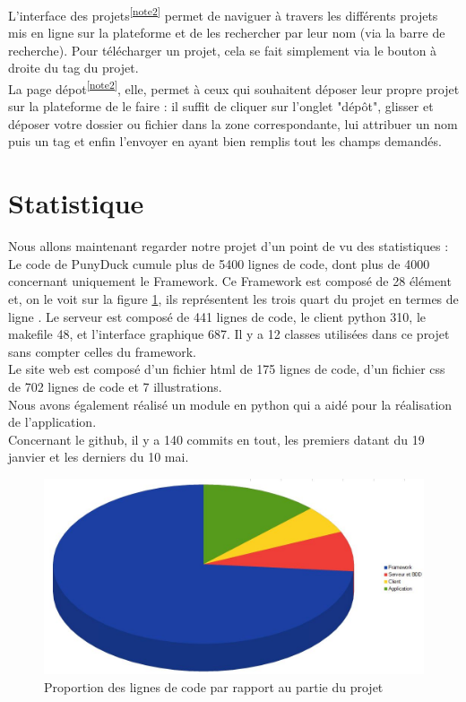 \documentclass[twoside]{report}
\begin{document}
L'interface des projets\textsuperscript{\ref{note2}} permet de naviguer à travers les différents projets mis en ligne sur la plateforme et de les rechercher par leur nom (via la barre de recherche). Pour télécharger un projet, cela se fait simplement via le bouton à droite du tag du projet.\\
La page dépot\textsuperscript{\ref{note2}}, elle, permet à ceux qui souhaitent déposer leur propre projet sur la plateforme de le faire : il suffit de cliquer sur l'onglet "dépôt", glisser et déposer votre dossier ou fichier dans la zone correspondante, lui attribuer un nom puis un tag et enfin l'envoyer en ayant bien remplis tout les champs demandés.

\newpage
\section{Statistique} %
Nous allons maintenant regarder notre projet d’un point de vu des statistiques :\\
Le code de PunyDuck cumule plus de 5400 lignes de code, dont plus de 4000 concernant uniquement le Framework. Ce Framework est composé de 28 élément et, on le voit sur la figure \ref{stats}, ils représentent les trois quart du projet en termes de ligne . Le serveur est composé de 441 lignes de code, le client python 310, le makefile 48, et l'interface graphique 687. Il y a 12 classes utilisées dans ce projet sans compter celles du framework.\\
Le site web est composé d’un fichier html de 175 lignes de code, d’un fichier css de 702 lignes de code et 7 illustrations. \\
Nous avons également réalisé un module en python qui a aidé pour la réalisation de l'application.\\
Concernant le github, il y a 140 commits en tout, les premiers datant du 19 janvier et les derniers du 10 mai.
\vspace{2cm}
\begin{figure}[h]
    \centering
    \includegraphics[scale=0.6]{camenbertstatPNDK.JPG}
    \caption{Proportion des lignes de code par rapport au partie du projet}
    \label{stats}
\end{figure}
\end{document}
